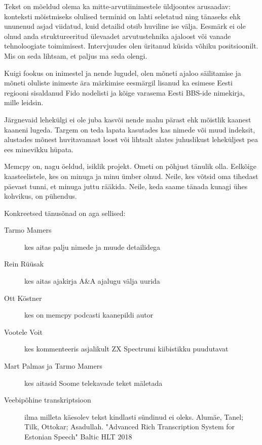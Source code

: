 Tekst on mõeldud olema ka mitte-arvutiinimestele üldjoontes arusaadav: 
konteksti mõistmiseks olulised terminid on lahti seletatud ning tänaseks ehk 
ununenud asjad viidatud, kuid detailid otsib huviline ise välja. Eesmärk ei ole 
olnud anda struktureeritud ülevaadet arvutustehnika ajaloost või vanade 
tehnoloogiate toimimisest. Intervjuudes olen üritanud küsida võhiku 
positsioonilt. Mis on seda lihtsam, et paljus ma seda olengi.

Kuigi fookus on inimestel ja nende lugudel, olen mõneti ajaloo säilitamise ja 
mõneti oluliste inimeste ära märkimise eesmärgil lisanud ka esimese Eesti regiooni
sisaldanud Fido nodelisti ja kõige varasema Eesti BBS-ide nimekirja, mille 
leidsin.

Järgnevaid lehekülgi ei ole juba kasvõi nende mahu pärast ehk mõistlik kaanest 
kaaneni lugeda. Targem on teda lapata kasutades kas nimede või muud indeksit, 
alustades mõnest huvitavamast loost või lihtsalt alates juhuslikust leheküljest 
pea ees minevikku hüpata.

Memcpy on, nagu öeldud, isiklik projekt. Ometi on põhjust tänulik olla. 
Eelkõige kaasteelistele, kes on minuga ja minu ümber olnud. Neile, kes võtsid 
oma tihedast päevast tunni, et minuga juttu rääkida. Neile, keda saame tänada
kunagi ühes kohvikus, on pühendus.

Konkreetsed tänusõnad on aga sellised:

\begin{description}
	\item[Tarmo Mamers] kes aitas palju nimede ja muude detailidega
	\item[Rein Rüüsak] kes aitas ajakirja A\&A 
ajalugu välja uurida
	\item[Ott Köstner] kes on memcpy podcasti 
kaanepildi autor
	\item[Vootele Voit] kes kommenteeris 
asjalikult ZX Spectrumi kiibistikku puudutavat
	\item[Mart Palmas ja Tarmo Mamers] kes aitasid Soome telekavade teket mäletada 
	\item[Veebipõhine transkriptsioon] ilma milleta käesolev tekst 
kindlasti sündinud ei oleks. Alumäe, Tanel; Tilk, Ottokar; Asadullah. "Advanced 
Rich Transcription System for Estonian Speech" Baltic HLT 2018
\end{description}
